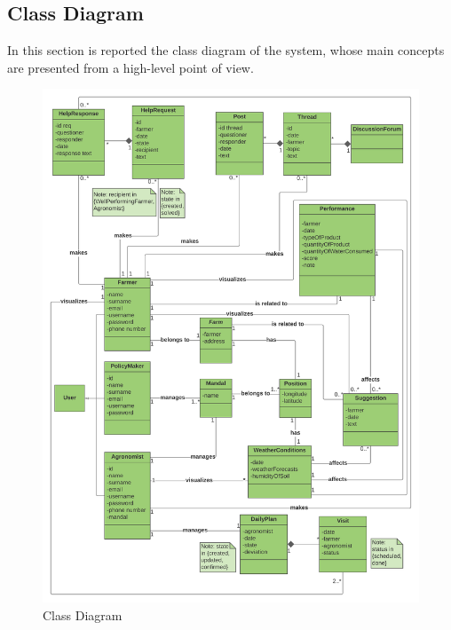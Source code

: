 \subsection{Class Diagram}
In this section is reported the class diagram of the system, whose main concepts are presented from a high-level point of view. 
\begin{figure}[H]
  \includegraphics[width=125.5mm,scale=0.9]{./Images/Class Diagram DREAM.png}
  \caption{Class Diagram}
\end{figure}

\newpage



